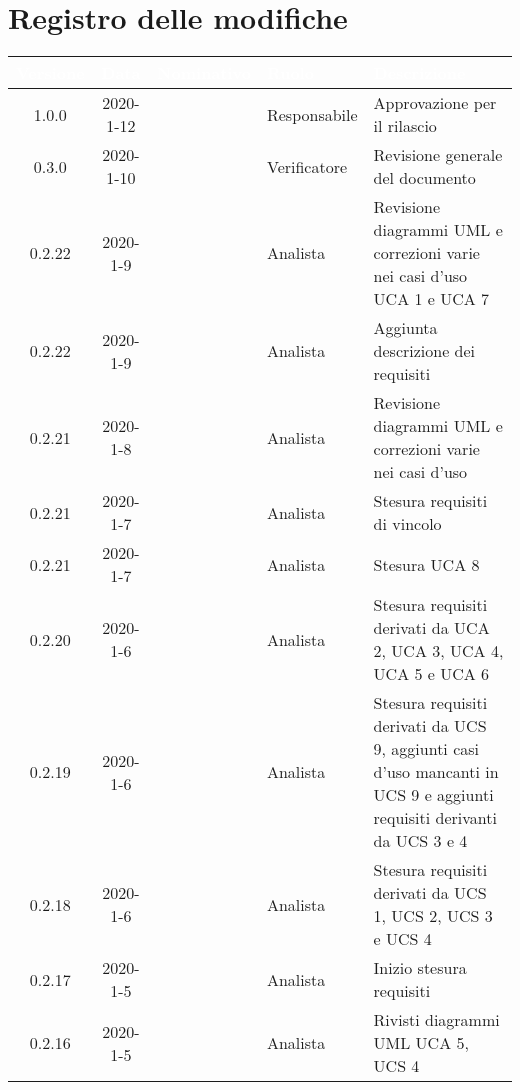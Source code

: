 \section*{Registro delle modifiche}
{
\renewcommand{\arraystretch}{1.5}
\centering
\begin{longtable}{ c c  C{4cm}  C{3cm} C{4cm}}
   \textcolor{white}{\textbf{Versione}} &
   \textcolor{white}{\textbf{Data}}&
   \textcolor{white}{\textbf{Nominativo}}&
   \textcolor{white}{\textbf{Ruolo}}&
   \textcolor{white}{\textbf{Descrizione}}\\
   \endhead


1.0.0 & 2020-1-12 & \AT{} & Responsabile & Approvazione per il rilascio \\

0.3.0 & 2020-1-10 & \SE{} & Verificatore & Revisione generale del documento\\

0.2.22 & 2020-1-9 & \PF{} & Analista & Revisione diagrammi UML e correzioni varie nei casi d'uso UCA 1 e UCA 7 \\

0.2.22 & 2020-1-9 & \CE{} & Analista & Aggiunta descrizione dei requisiti \\

0.2.21 & 2020-1-8 & \CE{} & Analista & Revisione diagrammi UML e correzioni varie nei casi d'uso \\

0.2.21 & 2020-1-7 & \PF{} & Analista & Stesura requisiti di vincolo\\

0.2.21 & 2020-1-7 & \PF{} & Analista & Stesura UCA 8\\

0.2.20 & 2020-1-6 & \PF{} & Analista & Stesura requisiti derivati da UCA 2, UCA 3, UCA 4, UCA 5 e UCA 6\\

0.2.19 & 2020-1-6 & \DF{} & Analista & Stesura requisiti derivati da UCS 9, aggiunti casi d'uso mancanti in UCS 9 e aggiunti requisiti derivanti da UCS 3 e 4 \\

0.2.18 & 2020-1-6 & \CE{} & Analista & Stesura requisiti derivati da UCS 1, UCS 2, UCS 3 e UCS 4 \\

0.2.17 & 2020-1-5 & \CE{} & Analista & Inizio stesura requisiti \\

0.2.16 & 2020-1-5 & \DF{} & Analista & Rivisti diagrammi UML UCA 5, UCS 4 \\


\end{longtable}}
